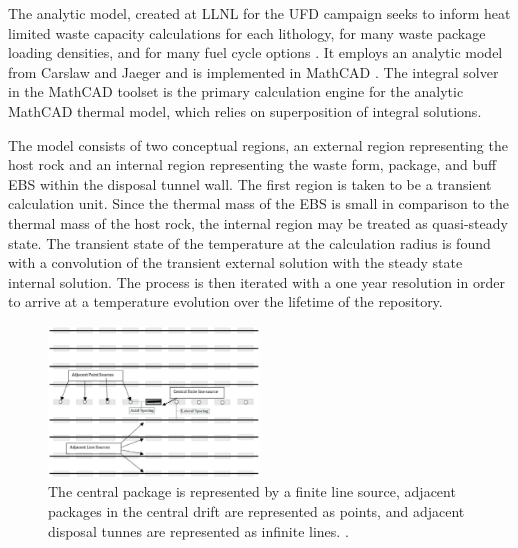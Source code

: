 The analytic model, created at \gls{LLNL} for the \gls{UFD} campaign seeks to 
inform heat limited waste capacity calculations for each lithology, for many 
waste package loading densities, and for many fuel cycle options 
\cite{hardin_generic_2011, greenberg_investigations_2012, 
greenberg_application_2012}. It employs an analytic model from Carslaw and 
Jaeger and is implemented in MathCAD \cite{carslaw_conduction_1959, 
ptc_mathcad_2010}.  The integral solver in the MathCAD toolset is the primary 
calculation engine for the analytic MathCAD thermal model, which relies on 
superposition of integral solutions.  


The model consists of two conceptual regions, an external region representing 
the host rock and an internal region representing the waste form, package, and 
buff \gls{EBS} within the disposal tunnel wall. The first region is taken to be  
a transient calculation unit.  Since the thermal mass of the \gls{EBS} is small 
in comparison to the thermal mass of the host rock, the internal region may be 
treated as quasi-steady state. The transient state of the temperature at the 
calculation radius is found with a convolution of the transient external 
solution with the steady state internal solution.  The process is then iterated 
with a one year resolution in order to arrive at a temperature evolution over 
the lifetime of the repository. 

\begin{figure}[h!]
  \begin{center}
    \includegraphics[width=0.5\textwidth]{./chapters/litrev/llnlConcept.eps}
  \end{center}
  \caption[LLNL analytic thermal model geometry]{The central package is represented by a finite line source, adjacent 
  packages in the central drift are represented as points, and adjacent disposal 
  tunnes are represented as infinite lines.
  \cite{greenberg_investigations_2012}.}
  \label{fig:llnl}
\end{figure}

